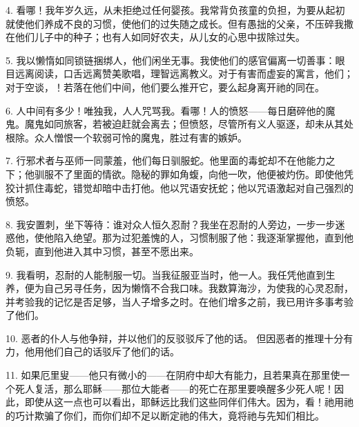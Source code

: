 4. 看哪！我年岁久远，从未拒绝过任何婴孩。我常背负孩童的负担，为要从起初就使他们养成不良的习惯，使他们的过失随之成长。但有愚拙的父亲，不压碎我撒在他们儿子中的种子；也有人如同好农夫，从儿女的心思中拔除过失。\par

5. 我以懒惰如同锁链捆绑人，他们闲坐无事。我使他们的感官偏离一切善事：眼目远离阅读，口舌远离赞美歌唱，理智远离教义。对于有害而虚妄的寓言，他们；对于空谈，！若落在他们中间，他们要么推开它，要么起身离开祂的同在。\par

6. 人中间有多少！唯独我，人人咒骂我。看哪！人的愤怒——每日磨碎他的魔鬼。魔鬼如同旅客，若被迫赶就会离去；但愤怒，尽管所有义人驱逐，却未从其处根除。众人憎恨一个软弱可怜的魔鬼，胜过有害的嫉妒。\par

7. 行邪术者与巫师一同蒙羞，他们每日驯服蛇。他里面的毒蛇却不在他能力之下；他驯服不了里面的情欲。隐秘的罪如角蝮，向他一吹，他便被灼伤。即使他凭狡计抓住毒蛇，错觉却暗中击打他。他以咒语安抚蛇；他以咒语激起对自己强烈的愤怒。\par

8. 我安置刺，坐下等待：谁对众人恒久忍耐？我坐在忍耐的人旁边，一步一步迷惑他，使他陷入绝望。那为过犯羞愧的人，习惯制服了他：我逐渐掌握他，直到他负轭，直到他进入其中习惯，甚至不愿出来。\par

9. 我看明，忍耐的人能制服一切。当我征服亚当时，他一人。我任凭他直到生养，便为自己另寻任务，因为懒惰不合我口味。我数算海沙，为使我的心灵忍耐，并考验我的记忆是否足够，当人子增多之时。在他们增多之前，我已用许多事考验了他们。\par

10. 恶者的仆人与他争辩，并以他们的反驳驳斥了他的话。 但因恶者的推理十分有力，他用他们自己的话驳斥了他们的话。\par

11. 如果厄里叟——他只有微小的——在阴府中却大有能力，且若果真在那里使一个死人复活，那么耶稣——那位大能者——的死亡在那里要唤醒多少死人呢！因此，即使从这一点也可以看出，耶稣远比我们这些同伴们伟大。因为，看！祂用祂的巧计欺骗了你们，而你们却不足以断定祂的伟大，竟将祂与先知们相比。\par

